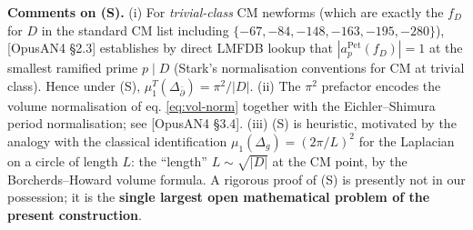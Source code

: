 \documentclass[
  11pt,
  a4paper,
]{amsart}
\begin{document}
\textbf{Comments on (S).} (i) For \emph{trivial-class} CM newforms (which are exactly
the \(f_D\) for \(D\) in the standard CM list including \(\{-67,-84,-148,-163,-195,-280\}\)),
{[}OpusAN4 §2.3{]} establishes by direct LMFDB lookup that
\(|a_p^{\mathrm{Pet}}(f_D)| = 1\) at the smallest ramified prime \(p \mid D\)
(Stark's normalisation conventions for CM at trivial class). Hence under (S),
\(\mu_1^T(\Delta_{\bar\partial}) = \pi^2 / |D|\). (ii) The \(\pi^2\) prefactor
encodes the volume normalisation of eq. \eqref{eq:vol-norm} together with the
Eichler--Shimura period normalisation; see {[}OpusAN4 §3.4{]}. (iii) (S) is
heuristic, motivated by the analogy with the classical identification
\(\mu_1(\Delta_g) = (2\pi/L)^2\) for the Laplacian on a circle of length \(L\): the
``length'' \(L \sim \sqrt{|D|}\) at the CM point, by the Borcherds--Howard volume
formula. A rigorous proof of (S) is presently not in our possession; it is the
\textbf{single largest open mathematical problem of the present construction}.
\end{document}
